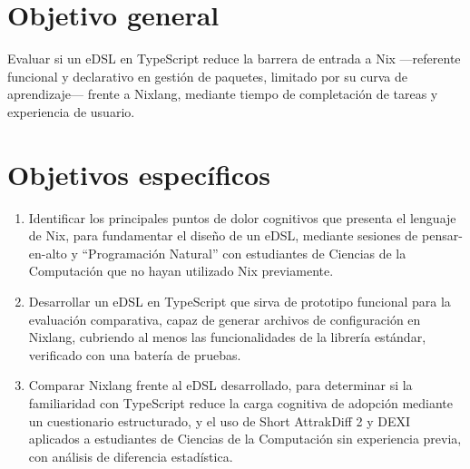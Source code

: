\section{Objetivo general}

Evaluar si un eDSL en TypeScript reduce la barrera de entrada a Nix ---referente funcional y declarativo en gestión de paquetes, limitado por su curva de aprendizaje--- frente a Nixlang, mediante tiempo de completación de tareas y experiencia de usuario.

\section{Objetivos específicos}

\begin{enumerate}
\item Identificar los principales puntos de dolor cognitivos que presenta el lenguaje de Nix, para fundamentar el diseño de un eDSL, mediante sesiones de pensar-en-alto y ``Programación Natural'' con estudiantes de Ciencias de la Computación que no hayan utilizado Nix previamente.
\item Desarrollar un eDSL en TypeScript que sirva de prototipo funcional para la evaluación comparativa, capaz de generar archivos de configuración en Nixlang, cubriendo al menos las funcionalidades de la librería estándar, verificado con una batería de pruebas.
\item Comparar Nixlang frente al eDSL desarrollado, para determinar si la familiaridad con TypeScript reduce la carga cognitiva de adopción mediante un cuestionario estructurado, y el uso de Short AttrakDiff 2 y DEXI aplicados a estudiantes de Ciencias de la Computación sin experiencia previa, con análisis de diferencia estadística.
\end{enumerate}
